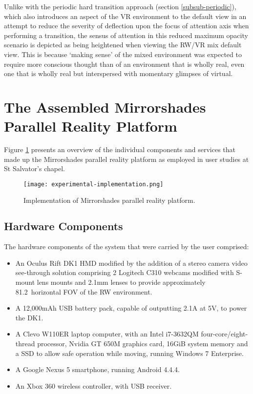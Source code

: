 Unlike with the periodic hard transition approach (section \ref{subsub-periodic}), which also introduces an aspect of the VR environment to the default view in an attempt to reduce the severity of deflection upon the focus of attention axis when performing a transition, the sensus of attention in this reduced maximum opacity scenario is depicted as being heightened when viewing the RW/VR mix default view. This is because `making sense' of the mixed environment was expected to require more conscious thought than of an environment that is wholly real, even one that is wholly real but interspersed with momentary glimpses of virtual.


\section{The Assembled Mirrorshades Parallel Reality Platform}

Figure \ref{experimentalimplementation} presents an overview of the individual components and services that made up the Mirrorshades parallel reality platform as employed in user studies at St Salvator's chapel.

\begin{figure}[h]
	\begin{center}
		\texttt{[image: experimental-implementation.png]}
		\caption{Implementation of Mirrorshades parallel reality platform.}
		\label{experimentalimplementation}
	\end{center}
\end{figure}

\subsection{Hardware Components}
The hardware components of the system that were carried by the user comprised:
\begin{itemize}
	\item An Oculus Rift DK1 HMD modified by the addition of a stereo camera video see-through solution comprising 2 Logitech C310 webcams modified with S-mount lens mounts and 2.1mm lenses to provide approximately 81.2\textdegree\ horizontal FOV of the RW environment.
	\item A 12,000mAh USB battery pack, capable of outputting 2.1A at 5V, to power the DK1.
	\item A Clevo W110ER laptop computer, with an Intel i7-3632QM four-core/eight-thread processor, Nvidia GT 650M graphics card, 16GiB system memory and a SSD to allow safe operation while moving, running Windows 7 Enterprise.
	\item A Google Nexus 5 smartphone, running Android 4.4.4.
	\item An Xbox 360 wireless controller, with USB receiver.
\end{itemize}


